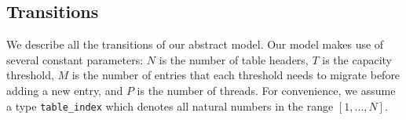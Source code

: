 \subsection{Transitions}

We describe all the transitions of our abstract model. Our model makes
use of several constant parameters: $N$ is the number of table
headers, $T$ is the capacity threshold, $M$ is the number of entries
that each threshold needs to migrate before adding a new entry, and
$P$ is the number of threads. For convenience, we assume a type
\texttt{table\_index} which denotes all natural numbers in the range
$[1,\ldots,N]$.


